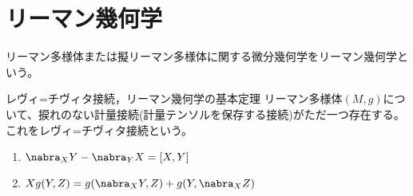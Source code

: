 \part{リーマン幾何学}

リーマン多様体または擬リーマン多様体に関する微分幾何学をリーマン幾何学という。

\begin{dfn}{レヴィ=チヴィタ接続，リーマン幾何学の基本定理}
    リーマン多様体$(M, g)$について、捩れのない計量接続(計量テンソルを保存する接続)がただ一つ存在する。これをレヴィ=チヴィタ接続という。
    \begin{enumerate}
        \item $\nabra_XY - \nabra_YX = [X, Y]$
        \item $Xg(Y, Z) = g(\nabra_XY, Z) + g(Y, \nabra_XZ)$
    \end{enumerate}
\end{dfn}

